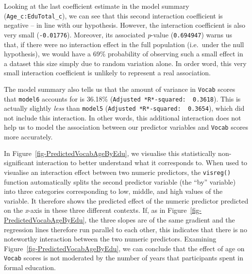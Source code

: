 \documentclass[
  letterpaper,
  DIV=11,
  numbers=noendperiod]{scrreprt}
\newenvironment{Shaded}{\begin{snugshade}}{\end{snugshade}}
\newcommand{\AttributeTok}[1]{\textcolor[rgb]{0.40,0.45,0.13}{#1}}
\newcommand{\ConstantTok}[1]{\textcolor[rgb]{0.56,0.35,0.01}{#1}}
\newcommand{\ControlFlowTok}[1]{\textcolor[rgb]{0.00,0.23,0.31}{\textbf{#1}}}
\newcommand{\FunctionTok}[1]{\textcolor[rgb]{0.28,0.35,0.67}{#1}}
\newcommand{\NormalTok}[1]{\textcolor[rgb]{0.00,0.23,0.31}{#1}}
\newcommand{\SpecialCharTok}[1]{\textcolor[rgb]{0.37,0.37,0.37}{#1}}
\newcommand{\StringTok}[1]{\textcolor[rgb]{0.13,0.47,0.30}{#1}}
\begin{document}
Looking at the last coefficient estimate in the model summary
(\texttt{Age\_c:EduTotal\_c}), we can see that this second interaction
coefficient is negative -- in line with our hypothesis. However, the
interaction coefficient is also very small (\texttt{-0.01776}).
Moreover, its associated \emph{p}-value (\texttt{0.694947}) warns us
that, if there were no interaction effect in the full population
(i.e.~under the null hypothesis), we would have a 69\% probability of
observing such a small effect in a dataset this size simply due to
random variation alone. In order word, this very small interaction
coefficient is unlikely to represent a real association.

The model summary also tells us that the amount of variance in
\texttt{Vocab} scores that \texttt{model6} accounts for is 36.18\%
(\texttt{Adjusted\ *R*-squared:\ \ 0.3618}). This is actually slightly
\emph{less} than \texttt{model5}
(\texttt{Adjusted\ *R*-squared:\ \ 0.3654}), which did not include this
interaction. In other words, this additional interaction does not help
us to model the association between our predictor variables and
\texttt{Vocab} scores more accurately.

In Figure~\ref{fig-PredictedVocabAgeByEdu}, we visualise this
statistically non-significant interaction to better understand what it
corresponds to. When used to visualise an interaction effect between two
numeric predictors, the \texttt{visreg()} function automatically splits
the second predictor variable (the ``by'' variable) into three
categories corresponding to low, middle, and high values of the
variable. It therefore shows the predicted effect of the numeric
predictor predicted on the \emph{x}-axis in these three different
contexts. If, as in Figure~\ref{fig-PredictedVocabAgeByEdu}, the three
slopes are of the same gradient and the regression lines therefore run
parallel to each other, this indicates that there is no noteworthy
interaction between the two numeric predictors. Examining
Figure~\ref{fig-PredictedVocabAgeByEdu}, we can conclude that the effect
of age on \texttt{Vocab} scores is not moderated by the number of years
that participants spent in formal education.

\begin{Shaded}
\end{Shaded}
\end{document}
